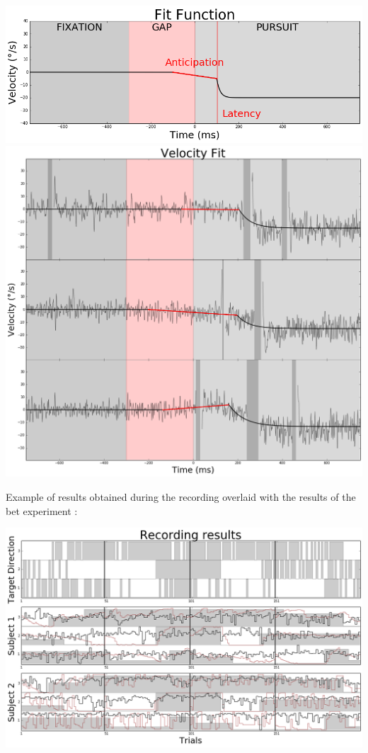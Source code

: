 \documentclass[profile,final,english, draft]{sciposter}%
\begin{document}
\begin{multicols}{3}
\begin{center} 
    \includegraphics[width=1\columnwidth]{Fonction_Fit}
    \includegraphics[width=1\columnwidth]{Fit_vitesse}
\end{center}


Example of results obtained during the recording overlaid with the results of the bet experiment :

\begin{center}
    \includegraphics[width=1\columnwidth]{results_enregistrement}
\end{center}


\end{multicols}
\end{document}
